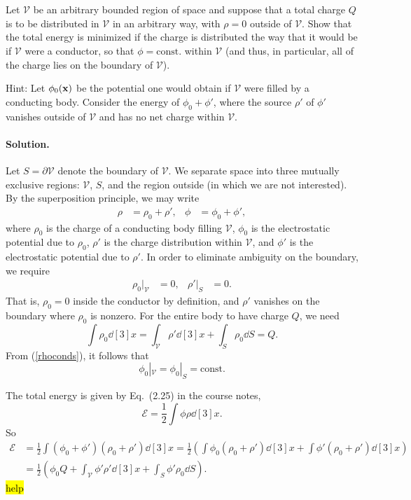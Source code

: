 \documentclass[11pt]{article}
\newcommand{\refeq}[1]{(\ref{#1})}
\newcommand{\beq}{\begin{equation*}}
\newcommand{\eeq}{\end{equation*}}
\newenvironment{statement}[1]
{
	\section{#1}
	\color{darkgray}
	\ignorespaces
}
{
}
\newenvironment{solution}
{
    \paragraph{Solution.}
    \ignorespaces
}
{
    \bigskip
}
\begin{document}



\newcommand{\cV}{\mathcal{V}}
\newcommand{\phio}{\phi_0}
\newcommand{\phiox}{\phio(\vx)}
\newcommand{\const}{\text{const.}}
\newcommand{\sig}{\sigma}
\newcommand{\alp}{\alpha}
\newcommand{\sigtv}{\sig(\tht, \vph)}

\newcommand{\sE}{\mathscr{E}}
\newcommand{\dcx}{\dd[3]{x}}
\newcommand{\rhoo}{\rho_0}
\newcommand{\dS}{\dd{S}}

\begin{statement}{}
	Let $\cV$ be an arbitrary bounded region of space and suppose that a total charge $Q$ is to be distributed in $\cV$ in an arbitrary way, with $\rho = 0$ outside of $\cV$.  Show that the total energy is minimized if the charge is distributed the way that it would be if $\cV$ were a conductor, so that $\phi = \const$ within $\cV$ (and thus, in particular, all of the charge lies on the boundary of $\cV$).
	
	Hint: Let $\phiox$ be the potential one would obtain if $\cV$ were filled by a conducting body.  Consider the energy of $\phio + \phi'$, where the source $\rho'$ of $\phi'$ vanishes outside of $\cV$ and has no net charge within $\cV$.
\end{statement}

\begin{solution}
	Let $S = \partial \cV$ denote the boundary of $\cV$.  We separate space into three mutually exclusive regions: $\cV$, $S$, and the region outside (in which we are not interested).  By the superposition principle, we may write
	\begin{align*}
		\rho &= \rhoo + \rho', &
		\phi &= \phio + \phi',
	\end{align*}
	where $\rhoo$ is the charge of a conducting body filling $\cV$, $\phio$ is the electrostatic potential due to $\rhoo$, $\rho'$ is the charge distribution within $\cV$, and $\phi'$ is the electrostatic potential due to $\rho'$.  In order to eliminate ambiguity on the boundary, we require
	\begin{align} \label{rhoconds}
		\rhoo|_\cV &= 0, &
		\rho'|_S &= 0.
	\end{align}
	That is, $\rhoo = 0$ inside the conductor by definition, and $\rho'$ vanishes on the boundary where $\rhoo$ is nonzero.  For the entire body to have charge $Q$, we need
	\beq
		\int \rhoo \dcx = \int_\cV \rho' \dcx + \int_S \rhoo \dS = Q.
	\eeq
	From \refeq{rhoconds}, it follows that
	\beq
		\phio|_\cV = \phio|_S = \const
	\eeq

	The total energy is given by Eq.~(2.25) in the course notes,
	\beq
		\sE = \frac{1}{2} \int \phi \rho \dcx.
	\eeq
	So
	\begin{align*}
		\sE &= \frac{1}{2} \int (\phio + \phi') (\rhoo + \rho') \dcx
		= \frac{1}{2} \left( \int \phio (\rhoo + \rho') \dcx + \int \phi' (\rhoo + \rho') \dcx \right) \\
		&= \frac{1}{2} \left( \phio Q + \int_\cV \phi' \rho' \dcx + \int_S \phi' \rhoo \dS \right).
	\end{align*}
	\hl{help}
\end{solution}
\end{document}
